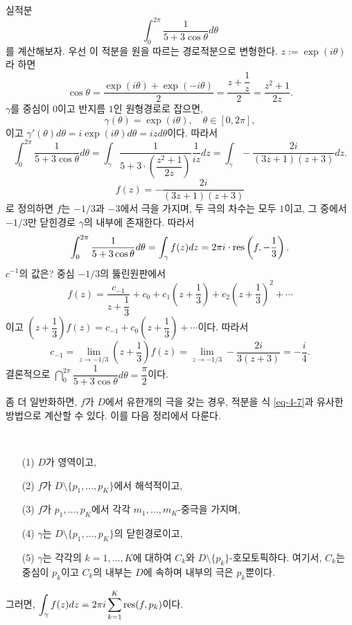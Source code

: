 \begin{salt_example}\label{example-4-18}
실적분
\[
\int_0^{2\pi} \dfrac1{5 + 3\cos\theta} d\theta
\]
를 계산해보자.
우선 이 적분을 원을 따르는 경로적분으로 변형한다.
$z:=\exp(i\theta)$라 하면
\[
\cos\theta = \dfrac{\exp(i\theta) + \exp(-i\theta)}2 
= \dfrac{z+ \dfrac1z}2 = \dfrac{z^2+1}{2z}.
\]
$\gamma$를 중심이 $0$이고 반지름 $1$인 원형경로로 잡으면,
\[
\gamma(\theta) = \exp(i\theta), \quad \theta \in [0,2\pi],
\]
이고 $\gamma'(\theta) d\theta = i\exp(i\theta)d\theta = izd\theta$이다.
따라서
\[
\int_0^{2\pi} \dfrac1{5 + 3\cos\theta} d\theta
= \int_\gamma \dfrac1{5+3\cdot\left(\dfrac{z^2+1}{2z}\right)}
\dfrac1{iz}dz
= \int_\gamma - \dfrac{2i}{(3z+1)(z+3)}dz.
\]
\[
f(z) = - \dfrac{2i}{(3z+1)(z+3)}
\]
로 정의하면 $f$는 $-1/3$과 $-3$에서 극을 가지며,
두 극의 차수는 모두 $1$이고,
그 중에서 $-1/3$만 닫힌경로 $\gamma$의 내부에 존재한다.
따라서
\[
\int_0^{2\pi} \displaystyle\frac1{5 + 3\cos\theta} d\theta
= \int_\gamma f(z)dz = 2\pi i \cdot \mathop{\mathrm{res}}\left(f, -\displaystyle\frac13\right).
\]
$c^{-1}$의 값은? 중심 $-1/3$의 뚫린원판에서
\[
f(z) = \dfrac{c_{-1}}{z+ \dfrac13} + c_0 + c_1\left(z + \dfrac13\right)
+ c_2\left(z+\dfrac13\right)^2 + \cdots
\]
이고 $\left(z+\dfrac13\right) f(z) = c_{-1} + c_0\left(z + \dfrac13\right) + \cdots$이다.
따라서
\[
c_{-1} = \lim_{z\to -1/3} \left(z+\dfrac13\right) f(z)
= \lim_{z\to -1/3} - \dfrac{2i}{3(z+3)} = - \dfrac i4.
\]
결론적으로 $\dint_0^{2\pi} \dfrac1{5 + 3\cos\theta} d\theta = \dfrac\pi2$이다.
\end{salt_example}

좀 더 일반화하면, $f$가 $D$에서 유한개의 극을 갖는 경우,
적분을 식 \eqref{eq-4-7}과 유사한 방법으로 계산할 수 있다.
이를 다음 정리에서 다룬다.

\begin{salt_theorem} [유수정리] \label{thm-4-11}
\
\begin{itemize}
\item[(1)] $D$가 영역이고,
\item[(2)] $f$가 $D\setminus \{p_1, \ldots, p_K\}$에서 해석적이고,
\item[(3)] $f$가 $p_1, \ldots, p_K$에서 각각 $m_1, \ldots, m_K$-중극을 가지며,
\item[(4)] $\gamma$는 $D\setminus \{p_1, \ldots, p_K\}$의 닫힌경로이고,
\item[(5)] $\gamma$는 각각의 $k=1,\ldots, K$에 대하여
$C_k$와 $D\setminus\{p_k\}$-호모토픽하다.
여기서, $C_k$는 중심이 $p_k$이고 $C_k$의 내부는 $D$에 속하며 
내부의 극은 $p_k$뿐이다.
\end{itemize}
그러면, $\displaystyle\int_\gamma f(z)dz = 2\pi i \sum\limits_{k=1}^K \mathop{\mathrm{res}}(f,p_k)$이다.
\end{salt_theorem}

